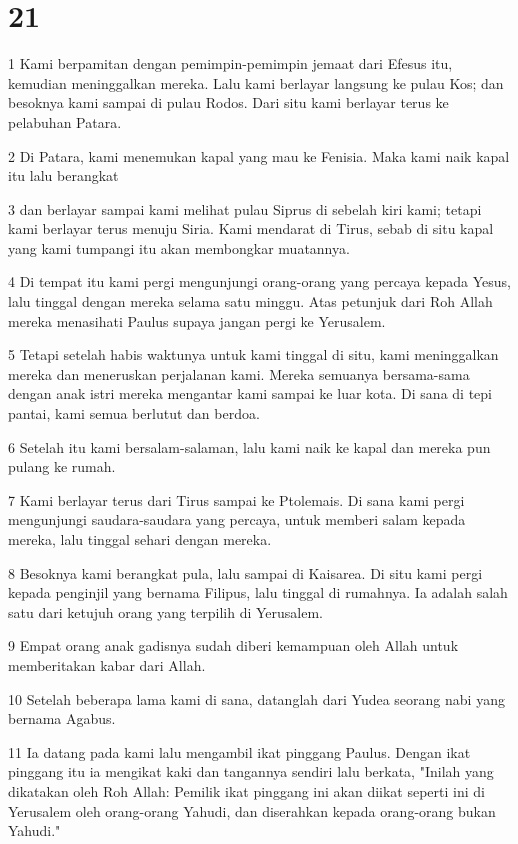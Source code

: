 \chapter{21}

\par 1 Kami berpamitan dengan pemimpin-pemimpin jemaat dari Efesus itu, kemudian meninggalkan mereka. Lalu kami berlayar langsung ke pulau Kos; dan besoknya kami sampai di pulau Rodos. Dari situ kami berlayar terus ke pelabuhan Patara.
\par 2 Di Patara, kami menemukan kapal yang mau ke Fenisia. Maka kami naik kapal itu lalu berangkat
\par 3 dan berlayar sampai kami melihat pulau Siprus di sebelah kiri kami; tetapi kami berlayar terus menuju Siria. Kami mendarat di Tirus, sebab di situ kapal yang kami tumpangi itu akan membongkar muatannya.
\par 4 Di tempat itu kami pergi mengunjungi orang-orang yang percaya kepada Yesus, lalu tinggal dengan mereka selama satu minggu. Atas petunjuk dari Roh Allah mereka menasihati Paulus supaya jangan pergi ke Yerusalem.
\par 5 Tetapi setelah habis waktunya untuk kami tinggal di situ, kami meninggalkan mereka dan meneruskan perjalanan kami. Mereka semuanya bersama-sama dengan anak istri mereka mengantar kami sampai ke luar kota. Di sana di tepi pantai, kami semua berlutut dan berdoa.
\par 6 Setelah itu kami bersalam-salaman, lalu kami naik ke kapal dan mereka pun pulang ke rumah.
\par 7 Kami berlayar terus dari Tirus sampai ke Ptolemais. Di sana kami pergi mengunjungi saudara-saudara yang percaya, untuk memberi salam kepada mereka, lalu tinggal sehari dengan mereka.
\par 8 Besoknya kami berangkat pula, lalu sampai di Kaisarea. Di situ kami pergi kepada penginjil yang bernama Filipus, lalu tinggal di rumahnya. Ia adalah salah satu dari ketujuh orang yang terpilih di Yerusalem.
\par 9 Empat orang anak gadisnya sudah diberi kemampuan oleh Allah untuk memberitakan kabar dari Allah.
\par 10 Setelah beberapa lama kami di sana, datanglah dari Yudea seorang nabi yang bernama Agabus.
\par 11 Ia datang pada kami lalu mengambil ikat pinggang Paulus. Dengan ikat pinggang itu ia mengikat kaki dan tangannya sendiri lalu berkata, "Inilah yang dikatakan oleh Roh Allah: Pemilik ikat pinggang ini akan diikat seperti ini di Yerusalem oleh orang-orang Yahudi, dan diserahkan kepada orang-orang bukan Yahudi."
